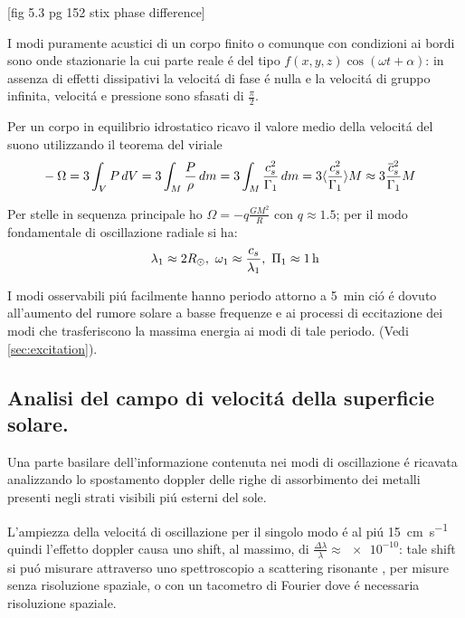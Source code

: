 \documentclass[../main.tex]{subfiles}
\begin{document}
[fig 5.3 pg 152 stix phase difference]

I modi puramente acustici di un corpo finito o comunque con condizioni ai bordi sono onde stazionarie la cui parte reale \'e del tipo $f(x,y,z)\cos{(\omega t+\alpha)}$: in assenza di effetti dissipativi la velocit\'a di fase \'e nulla e la velocit\'a di gruppo infinita, velocit\'a e pressione sono sfasati di $\frac{\pi}{2}$. 

Per un corpo in equilibrio idrostatico ricavo il valore medio della velocit\'a del suono utilizzando il teorema del viriale
\begin{align}
&-\Omega=3\int_VP\,dV=3\int_M\frac{P}{\rho}\,dm=3\int_M\frac{c_s^2}{\Gamma_1}\,dm=3\langle \frac{c_s^2}{\Gamma_1} \rangle M\approx3\frac{\overline{c}_s^2}{\Gamma_1}M
\end{align}

Per stelle in sequenza principale ho $\Omega=-q\frac{GM^2}{R}$ con $q\approx1.5$; per il modo fondamentale di oscillazione radiale si ha:
\begin{equation}
\lambda_1\approx 2\rsun{},\ \omega_1\approx\frac{c_s}{\lambda_1},\ \Pi_1\approx\SI{1}{\hour}
\end{equation}

I modi osservabili pi\'u facilmente hanno periodo attorno a \SI{5}{\minute} ci\'o \'e dovuto all'aumento del rumore solare a basse frequenze e ai processi di eccitazione dei modi che trasferiscono la massima energia ai modi di tale periodo. (Vedi \ref{sec:excitation}).

\subsection{Analisi del campo di velocit\'a della superficie solare.}

Una parte basilare dell'informazione contenuta nei modi di oscillazione \'e ricavata analizzando  lo spostamento doppler delle righe di assorbimento dei metalli presenti negli strati visibili pi\'u esterni del sole.

L'ampiezza della velocit\'a di oscillazione per il singolo modo \'e  al pi\'u \SI{15}{\cm\per\second} quindi l'effetto doppler causa uno shift, al massimo, di $\frac{\Delta\lambda}{\lambda}\approx\num{e-10}$: tale shift si pu\'o misurare attraverso uno spettroscopio a scattering risonante  , per misure senza risoluzione spaziale, o con un tacometro di Fourier dove \'e necessaria risoluzione spaziale.

\end{document}
